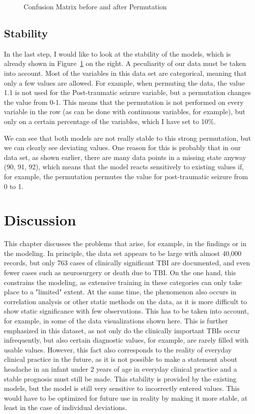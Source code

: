 \documentclass[10pt,letterpaper]{article}
\begin{document}
\begin{figure}[H]
    \centering
    \caption{Confusion Matrix before and after Permutation}
    \label{fig:confusion_matrix}
\end{figure}

\subsection{Stability}
In the last step, I would like to look at the stability of the models, which is already shown in Figure~\ref{fig:confusion_matrix} on the right. A peculiarity of our data must be taken into account. Most of the variables in this data set are categorical, meaning that only a few values are allowed. For example, when permuting the data, the value 1.1 is not used for the Post-traumatic seizure variable, but a permutation changes the value from 0-1. This means that the permutation is not performed on every variable in the row (as can be done with continuous variables, for example), but only on a certain percentage of the variables, which I have set to 10\%. 

We can see that both models are not really stable to this strong permutation, but we can clearly see deviating values. One reason for this is probably that in our data set, as shown earlier, there are many data points in a missing state anyway (90, 91, 92), which means that the model reacts sensitively to existing values if, for example, the permutation permutes the value for post-traumatic seizure from 0 to 1.

\section{Discussion}\label{discussion}

This chapter discusses the problems that arise, for example, in the findings or in the modeling. In principle, the data set appears to be large with almost 40,000 records, but only 763 cases of clinically significant TBI are documented, and even fewer cases such as neurosurgery or death due to TBI. On the one hand, this constrains the modeling, as extensive training in these categories can only take place to a "limited" extent. At the same time, the phenomenon also occurs in correlation analysis or other static methods on the data, as it is more difficult to show static significance with few observations. This has to be taken into account, for example, in some of the data visualizations shown here. This is further emphasized in this dataset, as not only do the clinically important TBIs occur infrequently, but also certain diagnostic values, for example, are rarely filled with usable values. However, this fact also corresponds to the reality of everyday clinical practice in the future, as it is not possible to make a statement about headache in an infant under 2 years of age in everyday clinical practice and a stable prognosis must still be made. This stability is provided by the existing models, but the model is still very sensitive to incorrectly entered values. This would have to be optimized for future use in reality by making it more stable, at least in the case of individual deviations.
\end{document}
